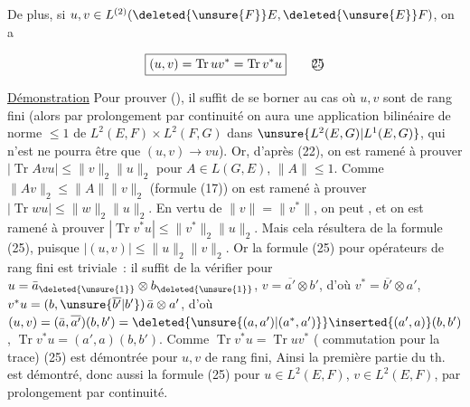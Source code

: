 De plus, si $u,v\in L^{(2)}(\deleted{\unsure{F}}E,\deleted{\unsure{E}}F)$, on a

\[
\boxed{(u,v)=\operatorname{Tr}uv^*=\operatorname{Tr}v^*u} \tag*{\textcircled{25}}
\]

\uline{Démonstration} Pour prouver (), il suffit 
 de se borner au cas où $u,v$ sont de rang fini
(alors  par prolongement par continuité on aura
une application bilinéaire de norme $\leq1$ de $L^2(E,F)\times
L^2(F,G)$ dans $\unsure{L^2(E,G)|L^1(E,G)}$, qui n'est   ne pourra
être que $(u,v)\to vu$). Or,  d'après (22),
on est ramené  à prouver $|\operatorname{Tr} Avu|\leq\|v\|_2\|u\|_2$
pour \unsure{$\forall$} $A\in L(G,E)$, $\|A\|\leq1$. Comme $\|Av\|_2\leq\|A\|\|v\|_2$
 (formule (17)) on est ramené à prouver
$|\operatorname{Tr}wu|\leq\|w\|_2\|u\|_2$. En vertu de $\|v\|=\|v^*\|$, on
peut  , et on est ramené
à prouver $|\operatorname{Tr}v^*u|\leq\|v^*\|_2\|u\|_2$. Mais cela résultera
de la formule (25), puisque $|(u,v)|\leq\|u\|_2\|v\|_2$.
 Or la formule (25) pour opérateurs de rang
fini est triviale \,: il suffit de la vérifier pour
$u=\bar a_{\deleted{\unsure{1}}}\otimes b_{\deleted{\unsure{1}}}$, $v=\overline{a'}\otimes b'$, d'où $v^*=\overline{b'}\otimes a'$,
$v^*u=(b,\unsure{\overline{b'}|b'})\,\bar a\otimes a'$,  d'où
 $(u,v)=(\bar a,\overline{a'})(b,b')=\deleted{\unsure{(a,a')|(a^*,a')}}\inserted{(a',a)}(b,b')$, $\operatorname{Tr}v^*u=(a',a)(b,b')$.
Comme $\operatorname{Tr}v^*u=\operatorname{Tr}uv^*$ ( commutation pour la trace)
(25) est démontrée pour $u,v$ de rang fini,  Ainsi
la première partie du th. est démontré, donc aussi
la formule (25) pour  $u\in L^2(E,F)$, $v\in L^2(E,F)$, par
prolongement par continuité.

